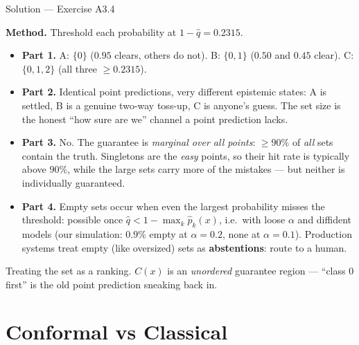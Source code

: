 \documentclass[aspectratio=169,11pt]{beamer}
\begin{document}
\begin{frame}{Solution --- Exercise A3.4}
\begin{solutionbox}
  \textbf{Method.} Threshold each probability at $1 - \hat q = 0.2315$.
  \begin{itemize}
    \item \textbf{Part 1.} A: $\{0\}$ ($0.95$ clears, others do not). B: $\{0, 1\}$
          ($0.50$ and $0.45$ clear). C: $\{0, 1, 2\}$ (all three $\ge 0.2315$).
    \item \textbf{Part 2.} Identical point predictions, very different epistemic
          states: A is settled, B is a genuine two-way toss-up, C is anyone's guess.
          The set size is the honest ``how sure are we'' channel a point prediction
          lacks.
    \item \textbf{Part 3.} No. The guarantee is \emph{marginal over all points}:
          $\ge 90\%$ of \emph{all} sets contain the truth. Singletons are the
          \emph{easy} points, so their hit rate is typically above $90\%$, while the
          large sets carry more of the mistakes --- but neither is individually
          guaranteed.
    \item \textbf{Part 4.} Empty sets occur when even the largest probability misses
          the threshold: possible once $\hat q < 1 - \max_k \hat p_k(x)$, i.e.\ with
          loose $\alpha$ and diffident models (our simulation: $0.9\%$ empty at
          $\alpha = 0.2$, none at $\alpha = 0.1$). Production systems treat empty
          (like oversized) sets as \textbf{abstentions}: route to a human.
  \end{itemize}
\end{solutionbox}
\begin{mistake}
  Treating the set as a ranking. $C(x)$ is an \emph{unordered} guarantee region ---
  ``class 0 first'' is the old point prediction sneaking back in.
\end{mistake}
\end{frame}

\section{Conformal vs Classical}
\end{document}

